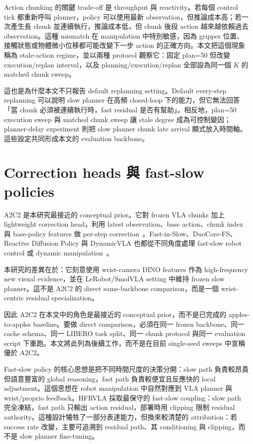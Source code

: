 \documentclass[12pt,a4paper,oneside]{report}
\newcommand{\smolvla}{SmolVLA}
\begin{document}
Action chunking 的關鍵 trade-off 是 throughput 與 reactivity。若每個 control tick 都重新呼叫 planner，policy 可以使用最新 observation，但推論成本高；若一次產生長 chunk 並連續執行，推論成本低，但 chunk 後段 action 越來越依賴過去 observation。這種 mismatch 在 manipulation 中特別敏感，因為 gripper 位置、接觸狀態或物體微小位移都可能改變下一步 action 的正確方向。本文把這個現象稱為 stale-action regime，並以兩種 protocol 觀察它：固定 plan=50 但改變 execution/replan interval，以及 planning/execution/replan 全部設為同一個 $K$ 的 matched chunk sweep。

這也是為什麼本文不只報告 default replanning setting。Default every-step replanning 可以說明 slow planner 在高頻 closed-loop 下的能力，但它無法回答「當 chunk 必須被連續執行時，fast residual 是否有幫助」。相反地，plan=50 execution sweep 與 matched chunk sweep 讓 stale degree 成為可控制變因；planner-delay experiment 則把 slow planner chunk late arrival 顯式放入時間軸。這些設定共同形成本文的 evaluation backbone。

\section{Correction heads 與 fast-slow policies}

A2C2 是本研究最接近的 conceptual prior。它對 frozen VLA chunks 加上 lightweight correction head，利用 latest observation、base action、chunk index 與 base-policy features 做 per-step correction~\citep{sendai2025a2c2}。Fast-in-Slow、DuoCore-FS、Reactive Diffusion Policy 與 DynamicVLA 也都從不同角度處理 fast-slow robot control 或 dynamic manipulation~\citep{chen2025fastinslow,zou2025duocorefs,xue2025rdp,xie2026dynamicvla}。

本研究的差異在於：它刻意使用 wrist-camera DINO features 作為 high-frequency new visual evidence，並在 LeRobot/\smolvla{} setting 中維持 frozen slow planner。這不是 A2C2 的 direct same-backbone comparison，而是一個 wrist-centric residual specialization。

因此 A2C2 在本文中的角色是最接近的 conceptual prior，而不是已完成的 apples-to-apples baseline。要做 direct comparison，必須在同一 frozen backbone、同一 cache schema、同一 LIBERO task split、同一 chunk protocol 與同一 evaluation script 下重跑。本文將此列為後續工作，而不是在目前 single-seed sweeps 中宣稱優於 A2C2。

Fast-slow policy 的核心思想是把不同時間尺度的決策分開：slow path 負責較昂貴但語意豐富的 global reasoning，fast path 負責較便宜且反應快的 local adjustment。這個思想在 robot manipulation 中自然對應到 VLA planner 與 wrist/proprio feedback。HFRVLA 採取最保守的 fast-slow coupling：slow path 完全凍結，fast path 只輸出 action residual，部署時用 clipping 限制 residual authority。這種設計犧牲了一部分表達能力，但換來較清楚的 attribution：若 success rate 改變，主要可追溯到 residual path、其 conditioning 與 clipping，而不是 slow planner fine-tuning。
\end{document}
